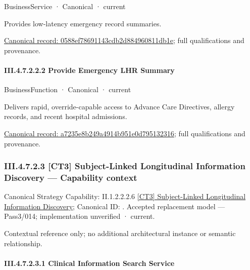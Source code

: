 \label{element:0588ef78691143cdb2d884960811db1e}
{\small BusinessService · Canonical · current}\par

Provides low-latency emergency record summaries.


{\footnotesize \href{../../../../../../../../continuum/business/business-service/0588ef78691143cdb2d884960811db1e.md}{Canonical record: 0588ef78691143cdb2d884960811db1e}; full qualifications and provenance.}\par
\paragraph*{III.4.7.2.2.2 Provide Emergency LHR Summary}
\label{navigation:III.4.7.2.2.2}

\label{element:a7235e8b249a4914b951e0d795132316}
{\small BusinessFunction · Canonical · current}\par

Delivers rapid, override-capable access to Advance Care Directives, allergy records, and recent hospital admissions.


{\footnotesize \href{../../../../../../../../continuum/business/business-function/a7235e8b249a4914b951e0d795132316.md}{Canonical record: a7235e8b249a4914b951e0d795132316}; full qualifications and provenance.}\par
\subsubsection*{III.4.7.2.3 [CT3] Subject-Linked Longitudinal Information Discovery — Capability context}
\label{navigation:III.4.7.2.3}

{\small Canonical Strategy Capability: II.1.2.2.2.6 \hyperref[element:645372b4e7eb431d916ff3254f11689b]{[CT3] Subject-Linked Longitudinal Information Discovery}; Canonical ID: \texttt{}. Accepted replacement model — Pass3/014; implementation unverified · current.}\par
Contextual reference only; no additional architectural instance or semantic relationship.\par
\paragraph*{III.4.7.2.3.1 Clinical Information Search Service}
\label{navigation:III.4.7.2.3.1}

